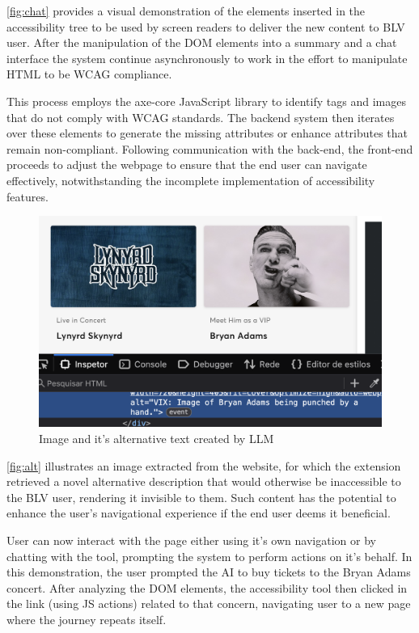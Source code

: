 \documentclass[conference]{IEEEtran}
\begin{document}
\autoref{fig:chat} provides a visual demonstration of the elements inserted in the accessibility tree to be used by screen readers to deliver the new content to BLV user. After the manipulation of the DOM elements into a summary and a chat interface the system continue asynchronously to work in the effort to manipulate HTML to be WCAG compliance.

This process employs the axe-core JavaScript library to identify tags and images that do not comply with WCAG standards. The backend system then iterates over these elements to generate the missing attributes or enhance attributes that remain non-compliant. Following communication with the back-end, the front-end proceeds to adjust the webpage to ensure that the end user can navigate effectively, notwithstanding the incomplete implementation of accessibility features.

\begin{figure}[h]
\centering
\includegraphics[width=\columnwidth]{images/3.png}
\caption{Image and it's alternative text created by LLM}
\label{fig:alt}
\end{figure}

\autoref{fig:alt} illustrates an image extracted from the website, for which the extension retrieved a novel alternative description that would otherwise be inaccessible to the BLV user, rendering it invisible to them. Such content has the potential to enhance the user's navigational experience if the end user deems it beneficial.

User can now interact with the page either using it's own navigation or by chatting with the tool, prompting the system to perform actions on it's behalf. In this demonstration, the user prompted the AI to buy tickets to the Bryan Adams concert. After analyzing the DOM elements, the accessibility tool then clicked in the link (using JS actions) related to that concern, navigating user to a new page where the journey repeats itself.
\end{document}

